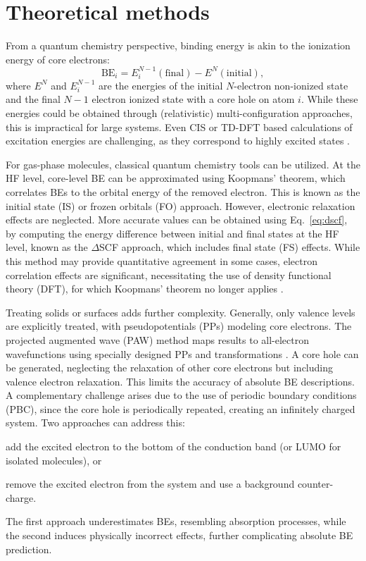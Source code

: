 \documentclass[journal=jpccck,manuscript=article]{achemso}
\begin{document}
\section{Theoretical methods}

From a quantum chemistry perspective, binding energy is akin to the ionization energy of core electrons:
\begin{equation}
	\text{BE}_i = E^{N-1}_i(\text{final}) - E^{N}(\text{initial}), \label{eq:dscf}
\end{equation}
where $E^{N}$ and $E^{N-1}_i$ are the energies of the initial $N$-electron non-ionized state and the final $N-1$ electron ionized state with a core hole on atom $i$. While these energies could be obtained through (relativistic) multi-configuration approaches, this is impractical for large systems. Even CIS or TD-DFT based calculations of excitation energies are challenging, as they correspond to highly excited states \cite{vinesPredictionCoreLevel2018}.

For gas-phase molecules, classical quantum chemistry tools can be utilized. At the HF level, core-level BE can be approximated using Koopmans' theorem, which correlates BEs to the orbital energy of the removed electron. This is known as the initial state (IS) or frozen orbitals (FO) approach. However, electronic relaxation effects are neglected. More accurate values can be obtained using Eq.~\eqref{eq:dscf}, by computing the energy difference between initial and final states at the HF level, known as the $\Delta$SCF approach, which includes final state (FS) effects. While this method may provide quantitative agreement in some cases, electron correlation effects are significant, necessitating the use of density functional theory (DFT), for which Koopmans' theorem no longer applies \cite{pueyobellafontPredictionCoreLevel2015,pueyobellafontPredictingCoreLevel2017}.

Treating solids or surfaces adds further complexity. Generally, only valence levels are explicitly treated, with pseudopotentials (PPs) modeling core electrons. The projected augmented wave (PAW) method maps results to all-electron wavefunctions using specially designed PPs and transformations \cite{blochlProjectorAugmentedwaveMethod1994}. A core hole can be generated, neglecting the relaxation of other core electrons but including valence electron relaxation. This limits the accuracy of absolute BE descriptions.
A complementary challenge arises due to the use of periodic boundary conditions (PBC), since the core hole is periodically repeated, creating an infinitely charged system. Two approaches can address this: 
\begin{inparaenum}[(i)]
	\item add the excited electron to the bottom of the conduction band (or LUMO for isolated molecules), or 
	\item remove the excited electron from the system and use a background counter-charge.
\end{inparaenum}
The first approach underestimates BEs, resembling absorption processes, while the second induces physically incorrect effects, further complicating absolute BE prediction.\cite{olovssonCorelevelShiftsComplex2006}
\end{document}
